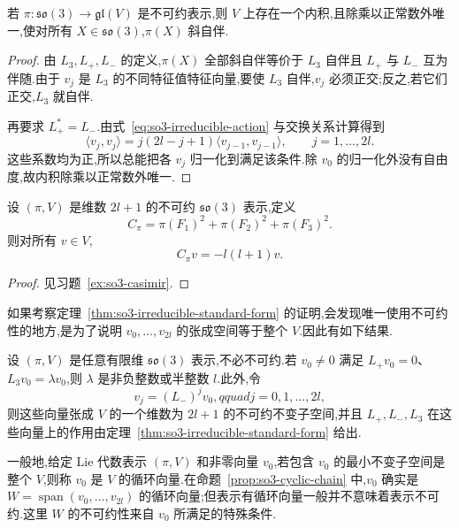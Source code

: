 \begin{proposition}[不可约表示的酉内积]\label{prop:so3-unitary-inner-product}
若 $\pi:\mathfrak{so}(3)\to\mathfrak{gl}(V)$ 是不可约表示,则 $V$ 上存在一个内积,且除乘以正常数外唯一,使对所有 $X\in\mathfrak{so}(3)$,$\pi(X)$ 斜自伴.
\end{proposition}

\begin{proof}
由 $L_3,L_+,L_-$ 的定义,$\pi(X)$ 全部斜自伴等价于 $L_3$ 自伴且 $L_+$ 与 $L_-$ 互为伴随.由于 $v_j$ 是 $L_3$ 的不同特征值特征向量,要使 $L_3$ 自伴,$v_j$ 必须正交;反之,若它们正交,$L_3$ 就自伴.

再要求 $L_+^*=L_-$.由式~\eqref{eq:so3-irreducible-action} 与交换关系计算得到
\[
\langle v_j,v_j\rangle=j(2l-j+1)\langle v_{j-1},v_{j-1}\rangle,
\qquad j=1,\ldots,2l.
\label{eq:so3-inner-product-normalization}
\]
这些系数均为正,所以总能把各 $v_j$ 归一化到满足该条件.除 $v_0$ 的归一化外没有自由度,故内积除乘以正常数外唯一.
\end{proof}

\begin{proposition}[Casimir 算子]\label{prop:so3-casimir}
设 $(\pi,V)$ 是维数 $2l+1$ 的不可约 $\mathfrak{so}(3)$ 表示,定义
\[
C_\pi=\pi(F_1)^2+\pi(F_2)^2+\pi(F_3)^2.
\]
则对所有 $v\in V$,
\[
C_\pi v=-l(l+1)v.
\]
\end{proposition}

\begin{proof}
见习题~\ref{ex:so3-casimir}.
\end{proof}

如果考察定理~\ref{thm:so3-irreducible-standard-form} 的证明,会发现唯一使用不可约性的地方,是为了说明 $v_0,\ldots,v_{2l}$ 的张成空间等于整个 $V$.因此有如下结果.

\begin{proposition}[一般有限维表示中的不可约链]\label{prop:so3-cyclic-chain}
设 $(\pi,V)$ 是任意有限维 $\mathfrak{so}(3)$ 表示,不必不可约.若 $v_0\neq0$ 满足 $L_+v_0=0$、$L_3v_0=\lambda v_0$,则 $\lambda$ 是非负整数或半整数 $l$.此外,令
\[
v_j=(L_-)^jv_0,qquad j=0,1,\ldots,2l,
\]
则这些向量张成 $V$ 的一个维数为 $2l+1$ 的不可约不变子空间,并且 $L_+,L_-,L_3$ 在这些向量上的作用由定理~\ref{thm:so3-irreducible-standard-form} 给出.
\end{proposition}

一般地,给定 Lie 代数表示 $(\pi,V)$ 和非零向量 $v_0$,若包含 $v_0$ 的最小不变子空间是整个 $V$,则称 $v_0$ 是 $V$ 的循环向量.在命题~\ref{prop:so3-cyclic-chain} 中,$v_0$ 确实是 $W=\operatorname{span}(v_0,\ldots,v_{2l})$ 的循环向量;但表示有循环向量一般并不意味着表示不可约.这里 $W$ 的不可约性来自 $v_0$ 所满足的特殊条件.

